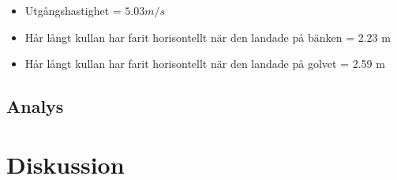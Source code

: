 \documentclass[11p]{article}
\begin{document}
    \begin{itemize}
        \item Utgångshastighet = $5.03 m/s$
        \item Hår långt kullan har farit horisontellt när den landade på bänken = 2.23 m
        \item Hår långt kullan har farit horisontellt när den landade på golvet = 2.59 m
    \end{itemize}
    \subsection{Analys}
    \section{Diskussion}
\end{document}
